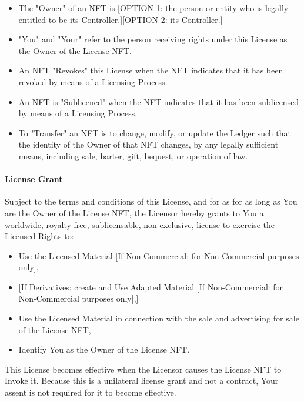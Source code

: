 \documentclass{article}
\begin{document}
	\begin{itemize}
	
	\item	 The "Owner" of an NFT is [OPTION 1: the person or entity who is legally entitled to be its Controller.][OPTION 2: its Controller.]
		
	\item	"You" and "Your" refer to the person receiving rights under this License as the Owner of the License NFT.

	\item	An NFT "Revokes" this License when the NFT indicates that it has been revoked by means of a Licensing Process.

	\item	An NFT is "Sublicened" when the NFT indicates that it has been sublicensed by means of a Licensing Process.

	\item	To "Transfer" an NFT is to change, modify, or update the Ledger such that the identity of the Owner of that NFT changes, by any legally sufficient means, including sale, barter, gift, bequest, or operation of law. 
	
	\end{itemize}



\paragraph{License Grant}

Subject to the terms and conditions of this License, and for as for as long as You are the Owner of the License NFT, the Licensor hereby grants to You a worldwide, royalty-free, sublicensable, non-exclusive, license to exercise the Licensed Rights to:
\begin{itemize}
\item Use the Licensed Material [If Non-Commercial: for Non-Commercial purposes only],
\item {[}If Derivatives: create and Use Adapted Material [If Non-Commercial: for Non-Commercial purposes only],]
\item Use the Licensed Material in connection with the sale and advertising for sale of the License NFT,
\item Identify You as the Owner of the License NFT.
\end{itemize}
This License becomes effective when the Licensor causes the License NFT to Invoke it. Because this is a unilateral license grant and not a contract, Your assent is not required for it to become effective.
\end{document}
